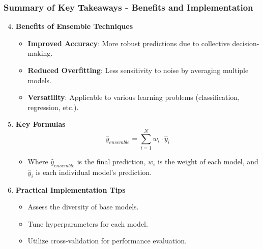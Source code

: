 \documentclass[aspectratio=169]{beamer}
\begin{document}
\begin{frame}[fragile]
    \frametitle{Summary of Key Takeaways - Benefits and Implementation}
    \begin{enumerate}
        \setcounter{enumi}{3} %
        \item \textbf{Benefits of Ensemble Techniques}
        \begin{itemize}
            \item \textbf{Improved Accuracy}: More robust predictions due to collective decision-making.
            \item \textbf{Reduced Overfitting}: Less sensitivity to noise by averaging multiple models.
            \item \textbf{Versatility}: Applicable to various learning problems (classification, regression, etc.).
        \end{itemize}

        \item \textbf{Key Formulas}
        \begin{equation}
            \hat{y}_{ensemble} = \sum_{i=1}^{N} w_i \cdot \hat{y}_i
        \end{equation}
        \begin{itemize}
            \item Where $\hat{y}_{ensemble}$ is the final prediction, $w_i$ is the weight of each model, and $\hat{y}_i$ is each individual model's prediction.
        \end{itemize}

        \item \textbf{Practical Implementation Tips}
        \begin{itemize}
            \item Assess the diversity of base models.
            \item Tune hyperparameters for each model.
            \item Utilize cross-validation for performance evaluation.
        \end{itemize}
    \end{enumerate}
\end{frame}
\end{document}
